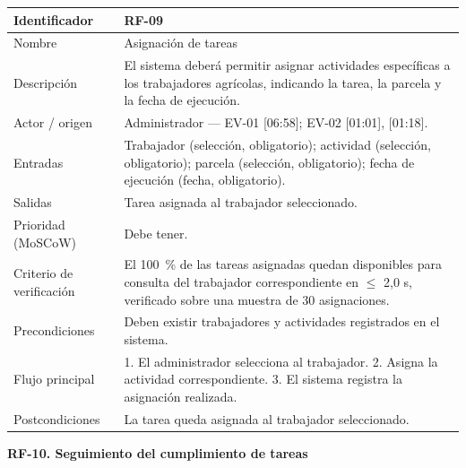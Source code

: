 \documentclass[12pt,a4paper]{article}
\begin{document}
\begin{center}
\begin{longtable}{|p{3.5cm}|p{10.7cm}|}
\hline
Identificador & RF-09 \\
\hline
Nombre & Asignación de tareas \\
\hline
Descripción & El sistema deberá permitir asignar actividades específicas a los trabajadores agrícolas, indicando la tarea, la parcela y la fecha de ejecución. \\
\hline
Actor / origen & Administrador --- EV-01 [06:58]; EV-02 [01:01], [01:18]. \\
\hline
Entradas & Trabajador (selección, obligatorio); actividad (selección, obligatorio); parcela (selección, obligatorio); fecha de ejecución (fecha, obligatorio). \\
\hline
Salidas & Tarea asignada al trabajador seleccionado. \\
\hline
Prioridad (MoSCoW) & Debe tener. \\
\hline
Criterio de verificación & El 100~\% de las tareas asignadas quedan disponibles para consulta del trabajador correspondiente en $\leq$ 2,0 s, verificado sobre una muestra de 30 asignaciones. \\
\hline
Precondiciones & Deben existir trabajadores y actividades registrados en el sistema. \\
\hline
Flujo principal & 1. El administrador selecciona al trabajador. 2. Asigna la actividad correspondiente. 3. El sistema registra la asignación realizada. \\
\hline
Postcondiciones & La tarea queda asignada al trabajador seleccionado. \\
\hline
\end{longtable}
\end{center}

\bigskip
\noindent\textbf{RF-10. Seguimiento del cumplimiento de tareas}
\label{tab:RF-10}
\end{document}
